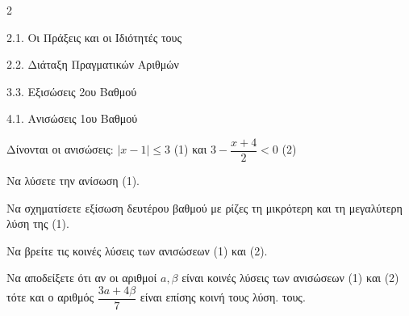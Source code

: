 \begin{ylh}{2}
    \item 2.1. Οι Πράξεις και οι Ιδιότητές τους
    \item 2.2. Διάταξη Πραγματικών Αριθμών
    \item 3.3. Εξισώσεις 2ου Βαθμού
    \item 4.1. Ανισώσεις 1ου Βαθμού
\end{ylh}
Δίνονται οι ανισώσεις: $|x-1| \le 3$ (1) και $3 - \dfrac{x+4}{2} < 0$ (2)
\begin{alist}
\item Να λύσετε την ανίσωση (1).
\item Να σχηματίσετε εξίσωση δευτέρου βαθμού με ρίζες τη μικρότερη και τη μεγαλύτερη λύση της (1).
\item Να βρείτε τις κοινές λύσεις των ανισώσεων (1) και (2).
\item Να αποδείξετε ότι αν οι αριθμοί $a, \beta$ είναι κοινές λύσεις των ανισώσεων (1) και (2) τότε και ο αριθμός $\dfrac{3a + 4\beta}{7}$ είναι επίσης κοινή τους λύση. τους.
\end{alist}

